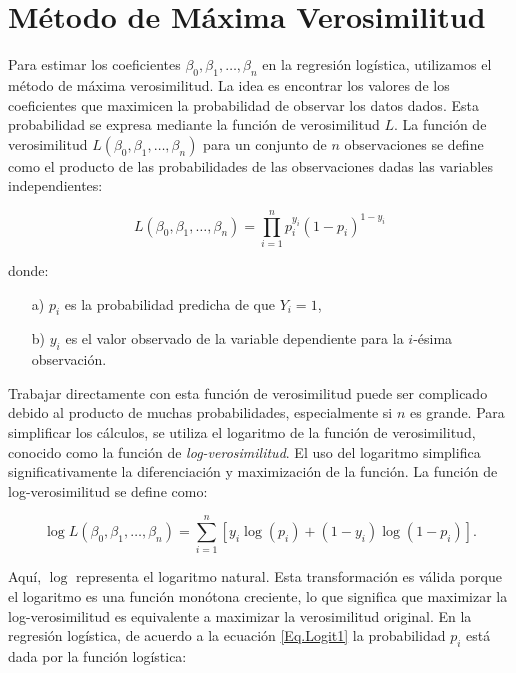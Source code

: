 \documentclass[a4paper]{report} %
\begin{document}
\section{M\'etodo de M\'axima Verosimilitud}

Para estimar los coeficientes $\beta_0, \beta_1, \ldots, \beta_n$ en la regresi\'on log\'istica, utilizamos el m\'etodo de m\'axima verosimilitud. La idea es encontrar los valores de los coeficientes que maximicen la probabilidad de observar los datos dados. Esta probabilidad se expresa mediante la funci\'on de verosimilitud $L$. La funci\'on de verosimilitud $L(\beta_0, \beta_1, \ldots, \beta_n)$ para un conjunto de $n$ observaciones se define como el producto de las probabilidades de las observaciones dadas las variables independientes:

\begin{equation}\label{Eq.Verosimilitud}
L(\beta_0, \beta_1, \ldots, \beta_n) = \prod_{i=1}^{n} p_i^{y_i} (1 - p_i)^{1 - y_i}
\end{equation}

donde:
\begin{itemize}
    \item[a) ] $p_i$ es la probabilidad predicha de que $Y_i = 1$,
    \item[b) ] $y_i$ es el valor observado de la variable dependiente para la $i$-\'esima observaci\'on.
\end{itemize}

Trabajar directamente con esta funci\'on de verosimilitud puede ser complicado debido al producto de muchas probabilidades, especialmente si $n$ es grande. Para simplificar los c\'alculos, se utiliza el logaritmo de la funci\'on de verosimilitud, conocido como la funci\'on de \textit{log-verosimilitud}. El uso del logaritmo simplifica significativamente la diferenciaci\'on y maximizaci\'on de la funci\'on. La funci\'on de log-verosimilitud se define como:

\begin{equation}\label{Funcion.LogVerosimilitud}
\log L(\beta_0, \beta_1, \ldots, \beta_n) = \sum_{i=1}^{n} \left[ y_i \log(p_i) + (1 - y_i) \log(1 - p_i) \right].
\end{equation}

Aqu\'i, $\log$ representa el logaritmo natural. Esta transformaci\'on es v\'alida porque el logaritmo es una funci\'on mon\'otona creciente, lo que significa que maximizar la log-verosimilitud es equivalente a maximizar la verosimilitud original. En la regresi\'on log\'istica, de acuerdo a la ecuaci\'on \ref{Eq.Logit1} la probabilidad $p_i$ est\'a dada por la funci\'on log\'istica:
\end{document}
